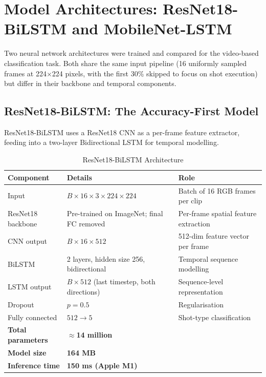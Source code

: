 \documentclass[11pt,a4paper]{article}
\begin{document}
\section{Model Architectures: ResNet18-BiLSTM and MobileNet-LSTM}\label{sec:model-arch}

Two neural network architectures were trained and compared for the video-based classification task. Both share the same input pipeline (16 uniformly sampled frames at 224$\times$224 pixels, with the first 30\% skipped to focus on shot execution) but differ in their backbone and temporal components.

\subsection{ResNet18-BiLSTM: The Accuracy-First Model}

ResNet18-BiLSTM uses a ResNet18 CNN as a per-frame feature extractor, feeding into a two-layer Bidirectional LSTM for temporal modelling.

\begin{table}[H]
\centering
\caption{ResNet18-BiLSTM Architecture}
\begin{tabular}{llp{6cm}}
\toprule
\textbf{Component} & \textbf{Details} & \textbf{Role} \\
\midrule
Input & $B \times 16 \times 3 \times 224 \times 224$ & Batch of 16 RGB frames per clip \\
ResNet18 backbone & Pre-trained on ImageNet; final FC removed & Per-frame spatial feature extraction \\
CNN output & $B \times 16 \times 512$ & 512-dim feature vector per frame \\
BiLSTM & 2 layers, hidden size 256, bidirectional & Temporal sequence modelling \\
LSTM output & $B \times 512$ (last timestep, both directions) & Sequence-level representation \\
Dropout & $p = 0.5$ & Regularisation \\
Fully connected & $512 \to 5$ & Shot-type classification \\
\midrule
\textbf{Total parameters} & \multicolumn{2}{l}{\textbf{$\approx$14 million}} \\
\textbf{Model size} & \multicolumn{2}{l}{\textbf{164 MB}} \\
\textbf{Inference time} & \multicolumn{2}{l}{\textbf{150 ms (Apple M1)}} \\
\bottomrule
\end{tabular}
\end{table}
\end{document}
